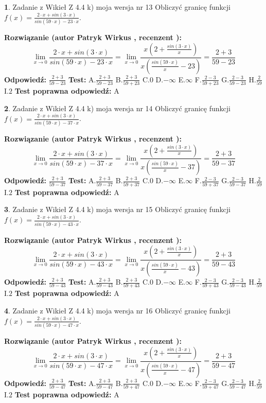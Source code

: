 \documentclass[12pt, a4paper]{article}
\theoremstyle{definition} %
\newtheorem{zad}{}
\newcommand{\zadStart}[1]{\begin{zad}#1\newline}
\newcommand{\zadStop}{\end{zad}}
\newcommand{\rozwStart}[2]{\noindent \textbf{Rozwiązanie (autor #1 , recenzent #2): }\newline}
\newcommand{\rozwStop}{\newline}
\newcommand{\odpStart}{\noindent \textbf{Odpowiedź:}\newline}
\newcommand{\odpStop}{\newline}
\newcommand{\testStart}{\noindent \textbf{Test:}\newline}
\newcommand{\testStop}{\newline}
\newcommand{\kluczStart}{\noindent \textbf{Test poprawna odpowiedź:}\newline}
\newcommand{\kluczStop}{\newline}
\begin{document}
\zadStart{Zadanie z Wikieł Z 4.4 k) moja wersja nr 13}
Obliczyć granicę funkcji $f(x)=\frac{2\cdot x +sin(3\cdot x)}{sin(59\cdot x) -23\cdot x}$.
\zadStop
\rozwStart{Patryk Wirkus}{}
$$\lim\limits_{x\to 0}\frac{2\cdot x +sin(3\cdot x)}{sin(59\cdot x) -23\cdot x}
=\lim\limits_{x\to 0}\frac{x(2+\frac{sin(3\cdot x)}{x})}{x(\frac{sin(59\cdot x)}{x}-23)}
=\frac{2+3}{59-23}$$
\rozwStop
\odpStart
$\frac{2+3}{59-23}$
\odpStop
\testStart
A.$\frac{2+3}{59-23}$
B.$\frac{2+3}{59+23}$
C.$0$
D.$-\infty$
E.$\infty$
F.$\frac{2-3}{59+23}$
G.$\frac{2-3}{59-23}$
H.$\frac{2}{59}$
I.$2$
\testStop
\kluczStart
A
\kluczStop



\zadStart{Zadanie z Wikieł Z 4.4 k) moja wersja nr 14}
Obliczyć granicę funkcji $f(x)=\frac{2\cdot x +sin(3\cdot x)}{sin(59\cdot x) -37\cdot x}$.
\zadStop
\rozwStart{Patryk Wirkus}{}
$$\lim\limits_{x\to 0}\frac{2\cdot x +sin(3\cdot x)}{sin(59\cdot x) -37\cdot x}
=\lim\limits_{x\to 0}\frac{x(2+\frac{sin(3\cdot x)}{x})}{x(\frac{sin(59\cdot x)}{x}-37)}
=\frac{2+3}{59-37}$$
\rozwStop
\odpStart
$\frac{2+3}{59-37}$
\odpStop
\testStart
A.$\frac{2+3}{59-37}$
B.$\frac{2+3}{59+37}$
C.$0$
D.$-\infty$
E.$\infty$
F.$\frac{2-3}{59+37}$
G.$\frac{2-3}{59-37}$
H.$\frac{2}{59}$
I.$2$
\testStop
\kluczStart
A
\kluczStop



\zadStart{Zadanie z Wikieł Z 4.4 k) moja wersja nr 15}
Obliczyć granicę funkcji $f(x)=\frac{2\cdot x +sin(3\cdot x)}{sin(59\cdot x) -43\cdot x}$.
\zadStop
\rozwStart{Patryk Wirkus}{}
$$\lim\limits_{x\to 0}\frac{2\cdot x +sin(3\cdot x)}{sin(59\cdot x) -43\cdot x}
=\lim\limits_{x\to 0}\frac{x(2+\frac{sin(3\cdot x)}{x})}{x(\frac{sin(59\cdot x)}{x}-43)}
=\frac{2+3}{59-43}$$
\rozwStop
\odpStart
$\frac{2+3}{59-43}$
\odpStop
\testStart
A.$\frac{2+3}{59-43}$
B.$\frac{2+3}{59+43}$
C.$0$
D.$-\infty$
E.$\infty$
F.$\frac{2-3}{59+43}$
G.$\frac{2-3}{59-43}$
H.$\frac{2}{59}$
I.$2$
\testStop
\kluczStart
A
\kluczStop



\zadStart{Zadanie z Wikieł Z 4.4 k) moja wersja nr 16}
Obliczyć granicę funkcji $f(x)=\frac{2\cdot x +sin(3\cdot x)}{sin(59\cdot x) -47\cdot x}$.
\zadStop
\rozwStart{Patryk Wirkus}{}
$$\lim\limits_{x\to 0}\frac{2\cdot x +sin(3\cdot x)}{sin(59\cdot x) -47\cdot x}
=\lim\limits_{x\to 0}\frac{x(2+\frac{sin(3\cdot x)}{x})}{x(\frac{sin(59\cdot x)}{x}-47)}
=\frac{2+3}{59-47}$$
\rozwStop
\odpStart
$\frac{2+3}{59-47}$
\odpStop
\testStart
A.$\frac{2+3}{59-47}$
B.$\frac{2+3}{59+47}$
C.$0$
D.$-\infty$
E.$\infty$
F.$\frac{2-3}{59+47}$
G.$\frac{2-3}{59-47}$
H.$\frac{2}{59}$
I.$2$
\testStop
\kluczStart
A
\kluczStop
\end{document}
